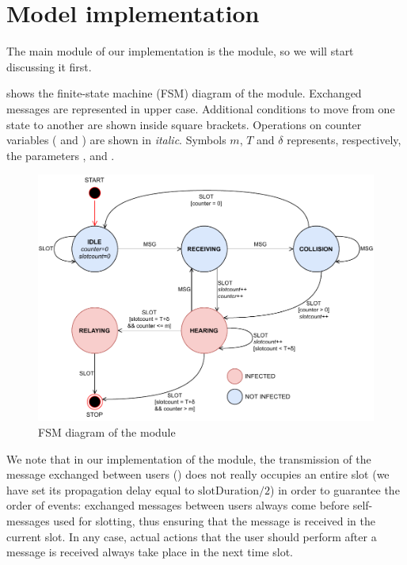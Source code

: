 \section{Model implementation}\label{sec:implementation}

The main module of our implementation is the  module, so we will
start discussing it first.

 shows the finite-state machine (FSM) diagram of the
 module. Exchanged messages are represented in upper case. Additional
conditions to move from one state to another are shown inside square brackets.
Operations on counter variables ( and ) are shown
in \textit{italic}. Symbols \(m\), \(T\) and \(\delta\) represents,
respectively, the parameters ,  and
.

\begin{figure}[htb]
	\centering
	\includegraphics[width=\textwidth]{img/userfsm}
	\caption{FSM diagram of the  module}\label{fig:userfsm}
\end{figure}

We note that in our implementation of the  module, the transmission
of the message exchanged between users () does not really occupies an
entire slot (we have set its propagation delay equal to
\(\textrm{slotDuration}/2\)) in order to guarantee the order of events:
exchanged messages between users always come before self-messages used for
slotting, thus ensuring that the message is received in the current slot. In any
case, actual actions that the user should perform after a message is received
always take place in the next time slot.


